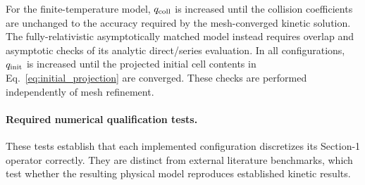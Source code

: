 \documentclass[11pt]{article}
\begin{document}
For the finite-temperature model, $q_{\rm coll}$ is increased until the collision
coefficients are unchanged to the accuracy required by the mesh-converged kinetic
solution.  The fully-relativistic asymptotically matched model instead requires overlap and
asymptotic checks of its analytic direct/series evaluation.  In all configurations, $q_{\rm init}$ is increased
until the projected initial cell contents in Eq.~\eqref{eq:initial_projection} are
converged.  These checks are performed independently of mesh refinement.

\paragraph{Required numerical qualification tests.}
These tests establish that each implemented configuration discretizes its Section-1
operator correctly.  They are distinct from external literature benchmarks, which test
whether the resulting physical model reproduces established kinetic results.
\end{document}
